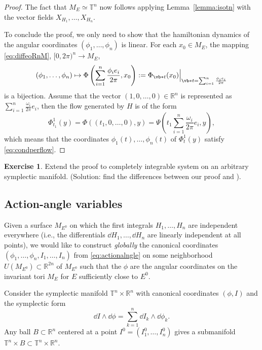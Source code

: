 \documentclass[english,fontsize=11pt,paper=b5]{scrbook}
\numberwithin{equation}{chapter}
\theoremstyle{definition}
\newtheorem{exercise}{Exercise}[chapter]
\begin{document}
\begin{proof}
        The fact that $M_E\simeq \mathbb{T}^n$ now follows applying Lemma~\ref{lemma:isotn} with the vector fields $X_{H_1}, \ldots, X_{H_n}$.

        To conclude the proof, we only need to show that the hamiltonian dynamics of the angular coordinates $(\phi_1, \ldots, \phi_n)$ is linear.
        For each $x_0\in M_E$, the mapping \eqref{eq:diffeoRnM}, $[0, 2\pi)^n \to M_E$,
        \begin{equation}
          (\phi_1, \ldots, \phi_n)\mapsto \Phi\left(\sum_{i=1}^n \frac{\phi_i e_i}{2\pi}, x_0\right) := \Phi_{\vb* t}(x_0)\Big|_{\vb* t = \sum_{i=1}^n \frac{\phi_i e_i}{2\pi}}
        \end{equation}
        is a bijection.
        Assume that the vector $(1, 0, \ldots, 0)\in\mathbb{R}^n$ is represented as $\sum_{i=1}^n \frac{\omega_i}{2\pi} e_i$, then the flow generated by $H$ is of the form
        \begin{equation}
          \Phi^1_{t_1}(y) = \Phi((t_1, 0, \ldots, 0), y)
          = \Psi\left(t_1 \sum_{i=1}^n \frac{\omega_i}{2\pi}e_i, y\right),
        \end{equation}
        which means that the coordinates $\phi_1(t), \ldots, \phi_n(t)$ of $\Phi_t^1(y)$ satisfy \eqref{eq:condperflow}.
      \end{proof}

      \begin{exercise}
        Extend the proof to completely integrable system on an arbitrary symplectic manifold. (Solution: find the differences between our proof and \cite[Theorem 13.3]{book:knauf}).
      \end{exercise}

      \subsection{Action-angle variables}

      Given a surface $M_{E^0}$ on which the first integrals $H_1, \ldots, H_n$ are independent everywhere (i.e., the differentials $\dd H_1, \ldots, \dd H_n$ are linearly independent at all points), we would like to construct \emph{globally} the canonical coordinates $(\phi_1, \ldots, \phi_n, I_1, \ldots, I_n)$ from \eqref{eq:actionalngle} on some neighborhood $U(M_{E^0})\subset \mathbb{R}^{2n}$ of $M_{E^0}$ such that the $\phi$ are the angular coordinates on the invariant tori $M_E$ for $E$ sufficiently close to $E^0$.

      Consider the symplectic manifold $\mathbb{T}^n \times \mathbb{R}^n$ with canonical coordinates $(\phi, I)$ and the symplectic form
      \begin{equation}
        \dd I \wedge \dd \phi = \sum_{k=1}^n \dd I_k \wedge \dd \phi_k.
      \end{equation}
      Any ball $B\subset\mathbb{R}^n$ centered at a point $I^0 = (I^0_1, \ldots, I^0_n)$ gives a submanifold $\mathbb{T}^n\times B \subset \mathbb{T}^n \times \mathbb{R}^n$.
\end{document}
